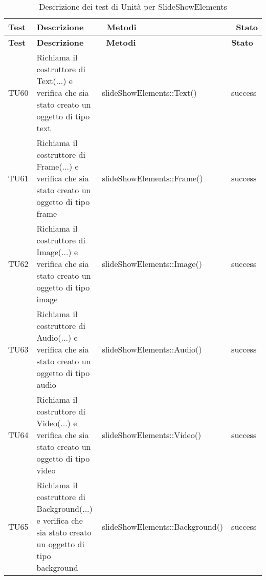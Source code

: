 		   \begin{longtable} [c]{| p{2cm} | p{6cm} |p{3cm} | p{2cm} |}
		 		 	 						\caption{Descrizione dei test di Unità per SlideShowElements \label{tab:verTestUnit}}\\
		 	  		 \hline
		 	  		 \textbf{Test} & \textbf{Descrizione} & \ \textbf{Metodi} & \ \textbf{Stato} \\
		 	  		 \hline
		 	  		 \endfirsthead
		 	  		 \hline
		 	  		 \textbf{Test} & \textbf{Descrizione} & \ \textbf{Metodi} & \textbf{Stato} \\
		 	  		 \hline
		 		 	 						\endhead
		 	  		 \hline
		 	  		 \endfoot
		 	  		 \hline
		 	  		 \endlastfoot
		  		 TU60 & Richiama il costruttore di Text(...) e verifica che sia stato creato un oggetto di tipo text  & slideShowElements::Text() & success \\
		  		 TU61 & Richiama il costruttore di Frame(...) e verifica che sia stato creato un oggetto di tipo frame & slideShowElements::Frame() & success \\
		  		 TU62 & Richiama il costruttore di Image(...) e verifica che sia stato creato un oggetto di tipo image & slideShowElements::Image() & success \\
		  		 TU63 & Richiama il costruttore di Audio(...) e verifica che sia stato creato un oggetto di tipo audio  & slideShowElements::Audio() & success \\
		  		 TU64 & Richiama il costruttore di Video(...) e verifica che sia stato creato un oggetto di tipo video  & slideShowElements::Video() & success \\
		  		 TU65 & Richiama il costruttore di Background(...) e verifica che sia stato creato un oggetto di tipo background  & slideShowElements::Background() & success \\
		  		 
		  		 \end{longtable}

